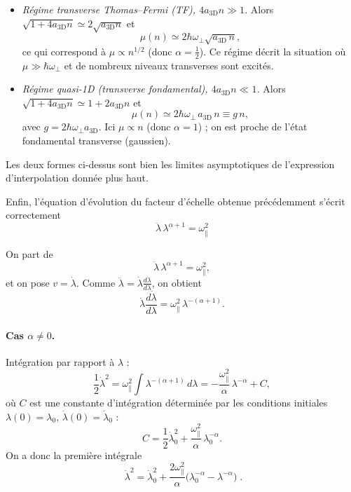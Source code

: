 \begin{itemize}
\item \emph{Régime transverse Thomas--Fermi (TF), \(4a_{\mathrm{3D}}n\gg1\).} 
Alors \(\sqrt{1+4a_{\mathrm{3D}}n}\simeq 2\sqrt{a_{\mathrm{3D}}n}\) et
\[
\mu(n)\simeq 2\hbar\omega_\perp\sqrt{a_{\mathrm{3D}}\,n},
\]
ce qui correspond à \(\mu\propto n^{1/2}\) (donc \(\alpha=\tfrac12\)). Ce régime décrit la situation où \(\mu\gg\hbar\omega_\perp\) et de nombreux niveaux transverses sont excités.
\item \emph{Régime quasi-1D (transverse fondamental), \(4a_{\mathrm{3D}}n\ll1\).} 
Alors \(\sqrt{1+4a_{\mathrm{3D}}n}\simeq 1+2a_{\mathrm{3D}}n\) et
\[
\mu(n)\simeq 2\hbar\omega_\perp\,a_{\mathrm{3D}}\,n \equiv g\,n,
\]
avec \(g=2\hbar\omega_\perp a_{\mathrm{3D}}\). Ici \(\mu\propto n\) (donc \(\alpha=1\)) ; on est proche de l'état fondamental transverse (gaussien).
\end{itemize}

Les deux formes ci-dessus sont bien les limites asymptotiques de l'expression d'interpolation donnée plus haut.

\medskip

Enfin, l'équation d'évolution du facteur d'échelle obtenue précédemment s'écrit correctement
\[
\boxed{\qquad \ddot\lambda\,\lambda^{\alpha+1}=\omega_\parallel^2 \qquad}
\]

On part de
\[
\ddot\lambda\,\lambda^{\alpha+1}=\omega_\parallel^2,
\]
et on pose \(v=\dot\lambda\). Comme \(\ddot\lambda=\dot\lambda\frac{d\dot\lambda}{d\lambda}\), on obtient
\[
\dot\lambda\frac{d\dot\lambda}{d\lambda}=\omega_\parallel^2\,\lambda^{-(\alpha+1)}.
\]

\paragraph{Cas \(\alpha\neq0\).}
Intégration par rapport à \(\lambda\) :
\[
\frac{1}{2}\dot\lambda^2
= \omega_\parallel^2\int \lambda^{-(\alpha+1)}\,d\lambda
= -\frac{\omega_\parallel^2}{\alpha}\,\lambda^{-\alpha} + C,
\]
où \(C\) est une constante d'intégration déterminée par les conditions initiales \(\lambda(0)=\lambda_0\), \(\dot\lambda(0)=\dot\lambda_0\) :
\[
C=\frac{1}{2}\dot\lambda_0^2+\frac{\omega_\parallel^2}{\alpha}\,\lambda_0^{-\alpha}.
\]
On a donc la première intégrale
\[
\boxed{\; \dot\lambda^2
= \dot\lambda_0^2 + \frac{2\omega_\parallel^2}{\alpha}\big(\lambda_0^{-\alpha}-\lambda^{-\alpha}\big)\; }.
\]

